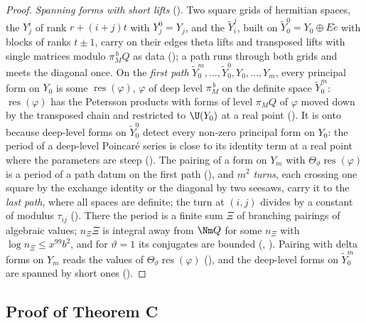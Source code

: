 \begin{proof}
\emph{Spanning forms with short lifts} ().
Two square grids of hermitian spaces, the $Y^i_j$ of rank $r+(i+j)t$ with $Y^0_j=Y_j$,
and the $\tilde Y^j_i$, built on $\tilde Y^0_0=Y_0\oplus E\tilde e$ with blocks of ranks $t\pm1$,
carry on their edges theta lifts and transposed lifts with single matrices modulo
$\pi_M^{\,b}Q$ as data (); a path runs through
both grids and meets the diagonal once. On the \emph{first path}
$\tilde Y^m_0,\dots,\tilde Y^0_0,Y_0,\dots,Y_m$, every principal form on $Y_0$ is some
$\operatorname{res}(\varphi)$, $\varphi$ of deep level $\pi_M^{\,b}$ on the definite space $\tilde Y^m_0$:
$\operatorname{res}(\varphi)$ has the Petersson products with forms of level $\pi_MQ$ of $\varphi$
moved down by the transposed chain and restricted to $\U(Y_0)$ at a real point
(). It is onto because
deep-level forms on $\tilde Y^0_0$ detect every non-zero principal form on $Y_0$: the period of a
deep-level Poincar\'e series is close to its identity term at a real point where the parameters
are steep (). The pairing of a form
on $Y_m$ with $\Theta_\vartheta\operatorname{res}(\varphi)$ is a period of a path datum on the first path
(), and $m^2$ \emph{turns}, each crossing one square
by the exchange identity or the diagonal by two seesaws, carry it to the \emph{last
path}, where all spaces are definite; the turn at $(i,j)$ divides by a constant of modulus
$\tau_{ij}$ (). There the period is a
finite sum $\Xi$ of branching pairings of algebraic values; $n_\Xi\Xi$ is integral away from
$\Nm Q$ for some $n_\Xi$ with $\log n_\Xi\le x^{99}b^2$, and for $\vartheta=1$ its conjugates are bounded
(,
). Pairing with delta forms on $Y_m$ reads the values of
$\Theta_\vartheta\operatorname{res}(\varphi)$ (), and the
deep-level forms on $\tilde Y^m_0$ are spanned by short ones
().
\end{proof}

\subsection{Proof of Theorem C}\label{det-chain:sec:proofC}

